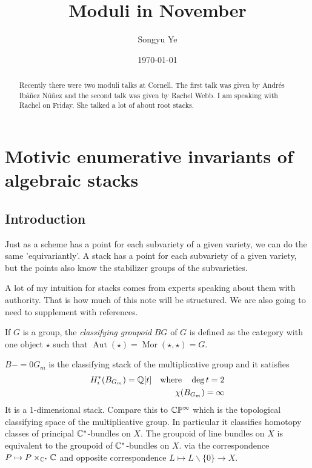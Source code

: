\documentclass[12pt]{article}
\begin{document}
\rhead{\today}
\cfoot{\thepage}

\title{Moduli in November}

\author{Songyu Ye}
\date{\today}
\maketitle


\begin{abstract}
Recently there were two moduli talks at Cornell. 
The first talk was given by Andrés Ibáñez Núñez and the second talk was given by Rachel Webb.
I am speaking with Rachel on Friday. She talked a lot of about root stacks.
\end{abstract}

\tableofcontents

\section{Motivic enumerative invariants of algebraic stacks}
\subsection{Introduction}
 Just as a scheme has a point
for each subvariety of a given variety, we can do the same 'equivariantly'.
A stack has a point for each subvariety of a given variety, but the points
also know the stabilizer groups of the subvarieties.

\hfill

A lot of my intuition for stacks comes from experts speaking 
about them with authority. That is how much of this note will be structured.
We are also going to need to supplement with references. 

\begin{definition}
    If \( G \) is a group, the \textit{classifying groupoid} \( BG \) of \( G \) is defined as the category with one object \( \star \) such that \( \operatorname{Aut}(\star) = \operatorname{Mor}(\star, \star) = G \).
    \end{definition}
\begin{example}
    $B-=0{G_m}$ is the classifying stack of the multiplicative group and it satisfies \begin{align*}
        H_i^*(B_{G_m}) = \mathbb{Q}[t] \quad \text{where} \quad \deg t = 2 \\
        \chi(B_{G_m}) = \infty
    \end{align*} It is a 1-dimensional stack. Compare this to $\mathbb{C}\mathbb{P}^\infty$ which is the
    topological classifying space of the multiplicative group. In particular it classifies
    homotopy classes of principal $\mathbb{C}^*$-bundles on $X$. The groupoid of 
    line bundles on $X$ is equivalent to the groupoid of $\mathbb{C}^*$-bundles on $X$.
    via the correspondence $P \mapsto P \times_{\mathbb{C}^*} \mathbb{C}$ and 
    opposite correspondence $L \mapsto L \backslash \{0\} \to X$.
\end{example}
\end{document}
